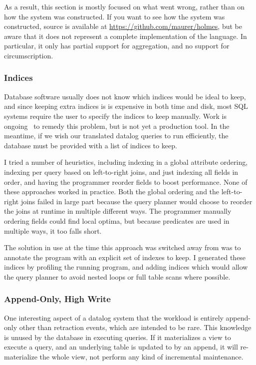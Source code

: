 As a result, this section is mostly focused on what went wrong, rather than on how the system was constructed.
If you want to see how the system was constructed, source is available at \url{https://github.com/maurer/holmes}, but be aware that it does not represent a complete implementation of the language.
In particular, it only has partial support for aggregation, and no support for circumscription.

\subsubsection{Indices}
Database software usually does not know which indices would be ideal to keep, and since keeping extra indices is is expensive in both time and disk, most SQL systems require the user to specify the indices to keep manually.
Work is ongoing~\cite{peloton} to remedy this problem, but is not yet a production tool.
In the meantime, if we wish our translated datalog queries to run efficiently, the database must be provided with a list of indices to keep.

I tried a number of heuristics, including indexing in a global attribute ordering, indexing per query based on left-to-right joins, and just indexing all fields in order, and having the programmer reorder fields to boost performance.
None of these approaches worked in practice.
Both the global ordering and the left-to-right joins failed in large part because the query planner would choose to reorder the joins at runtime in multiple different ways.
The programmer manually ordering fields could find local optima, but because predicates are used in multiple ways, it too falls short.

The solution in use at the time this approach was switched away from was to annotate the program with an explicit set of indexes to keep.
I generated these indices by profiling the running program, and adding indices which would allow the query planner to avoid nested loops or full table scans where possible.

\subsubsection{Append-Only, High Write}
One interesting aspect of a datalog system that the workload is entirely append-only other than retraction events, which are intended to be rare.
This knowledge is unused by the database in executing queries.
If it materializes a view to execute a query, and an underlying table is updated to by an append, it will re-materialize the whole view, not perform any kind of incremental maintenance.

